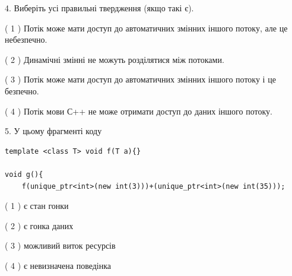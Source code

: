 \documentclass[12pt, ukrainian]{article}
\begin{document}
\begin {large}
{%
4. Виберіть усі правильні твердження (якщо такі є).\par
\vspace{2mm}

( 1 ) Потік може мати доступ до автоматичних змінних іншого потоку, але це небезпечно.%

( 2 ) Динамічні змінні не можуть розділятися між потоками.%

( 3 ) Потік може мати доступ до автоматичних змінних іншого потоку і це безпечно.%

( 4 ) Потік мови С++ не може отримати доступ до даних іншого потоку.%


5. У цьому фрагменті коду
\begin{verbatim}
template <class T> void f(T a){}

void g(){
    f(unique_ptr<int>(new int(3)))+(unique_ptr<int>(new int(35)));
\end{verbatim}

( 1 ) є стан гонки%

( 2 ) є гонка даних%

( 3 ) можливий виток ресурсів%

( 4 ) є невизначена поведінка%
}
\end {large}
\end{document}
